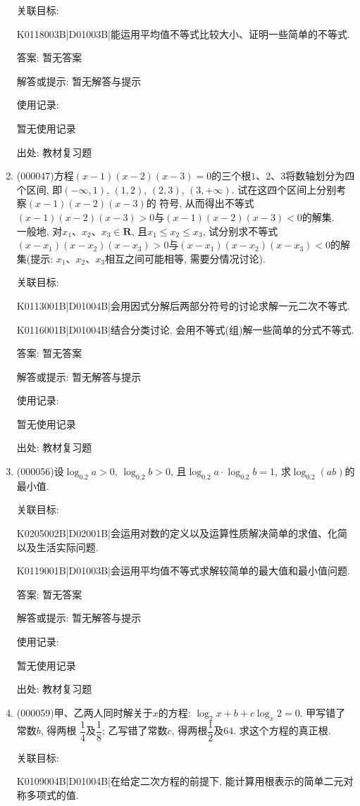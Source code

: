 \documentclass[10pt,a4paper]{article}
\begin{document}
\begin{enumerate}[1.]
关联目标:

K0118003B|D01003B|能运用平均值不等式比较大小、证明一些简单的不等式.

答案: 暂无答案

解答或提示: 暂无解答与提示

使用记录:

暂无使用记录


出处: 教材复习题
\item { (000047)}方程$(x-1)(x-2)(x-3)=0$的三个根$1$、$2$、$3$将数轴划分为四个区间, 即$(-\infty, 1)$, $(1, 2)$, $(2, 3)$, $(3, +\infty)$. 试在这四个区间上分别考察$(x-1)(x-2)(x-3)$的
符号, 从而得出不等式$(x-1)(x-2)(x-3)>0$与$(x-1)(x-2)(x-3)<0$的解集.\\
一般地, 对$x_1$、$x_2$、$x_3\in \mathbf{R}$, 且$x_1\le x_2\le x_3$, 试分别求不等式$(x-x_1)(x-x_2)(x-x_3)>0$与$(x-x_1)(x-x_2)(x-x_3)<0$的解集(提示: $x_1$、$x_2$、$x_3$相互之间可能相等, 需要分情况讨论).


关联目标:

K0113001B|D01004B|会用因式分解后两部分符号的讨论求解一元二次不等式.

K0116001B|D01004B|结合分类讨论, 会用不等式(组)解一些简单的分式不等式.

答案: 暂无答案

解答或提示: 暂无解答与提示

使用记录:

暂无使用记录


出处: 教材复习题
\item { (000056)}设$\log_{0.2}a>0$, $\log_{0.2}b>0$, 且$\log_{0.2}a\cdot \log_{0.2}b=1$, 求$\log_{0.2}(ab)$的最小值.


关联目标:

K0205002B|D02001B|会运用对数的定义以及运算性质解决简单的求值、化简以及生活实际问题.

K0119001B|D01003B|会运用平均值不等式求解较简单的最大值和最小值问题.

答案: 暂无答案

解答或提示: 暂无解答与提示

使用记录:

暂无使用记录


出处: 教材复习题
\item { (000059)}甲、乙两人同时解关于$x$的方程: $\log_2x+b+c\log_x2=0$. 甲写错了常数$b$, 得两根
$\dfrac 14$及$\dfrac 18$; 乙写错了常数$c$, 得两根$\dfrac 12$及$64$. 求这个方程的真正根.


关联目标:

K0109004B|D01004B|在给定二次方程的前提下, 能计算用根表示的简单二元对称多项式的值.


\end{enumerate}
\end{document}
